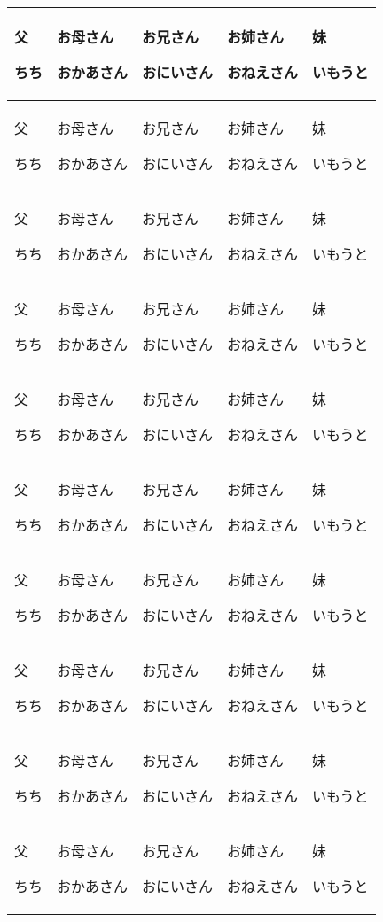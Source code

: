 \documentclass[10pt,a4j, landscape, dvipdfmx]{utarticle}
\def\cell(#1,#2){\hspace*{.1cm} #1 \newline \rule{0pt}{4ex} \hspace*{1cm} {\small #2}}
\begin{document}
\newcommand\T{\rule{0pt}{2.6ex}} 


\begin{tabular}{|p{3.5cm} | p{3.5cm} | p{3.5cm} |  p{3.5cm} |  p{3.5cm} |}
\hline 
 \cell(父,ちち) & \cell(お母さん,おかあさん) & \cell(お兄さん,おにいさん) & \cell(お姉さん,おねえさん) & \cell(妹,いもうと) \tabularnewline \hline
 \cell(父,ちち) & \cell(お母さん,おかあさん) & \cell(お兄さん,おにいさん) & \cell(お姉さん,おねえさん) & \cell(妹,いもうと) \tabularnewline \hline
 \cell(父,ちち) & \cell(お母さん,おかあさん) & \cell(お兄さん,おにいさん) & \cell(お姉さん,おねえさん) & \cell(妹,いもうと) \tabularnewline \hline
 \cell(父,ちち) & \cell(お母さん,おかあさん) & \cell(お兄さん,おにいさん) & \cell(お姉さん,おねえさん) & \cell(妹,いもうと) \tabularnewline \hline
 \cell(父,ちち) & \cell(お母さん,おかあさん) & \cell(お兄さん,おにいさん) & \cell(お姉さん,おねえさん) & \cell(妹,いもうと) \tabularnewline \hline
 \cell(父,ちち) & \cell(お母さん,おかあさん) & \cell(お兄さん,おにいさん) & \cell(お姉さん,おねえさん) & \cell(妹,いもうと) \tabularnewline \hline
 \cell(父,ちち) & \cell(お母さん,おかあさん) & \cell(お兄さん,おにいさん) & \cell(お姉さん,おねえさん) & \cell(妹,いもうと) \tabularnewline \hline
 \cell(父,ちち) & \cell(お母さん,おかあさん) & \cell(お兄さん,おにいさん) & \cell(お姉さん,おねえさん) & \cell(妹,いもうと) \tabularnewline \hline
 \cell(父,ちち) & \cell(お母さん,おかあさん) & \cell(お兄さん,おにいさん) & \cell(お姉さん,おねえさん) & \cell(妹,いもうと) \tabularnewline \hline
 \cell(父,ちち) & \cell(お母さん,おかあさん) & \cell(お兄さん,おにいさん) & \cell(お姉さん,おねえさん) & \cell(妹,いもうと) \tabularnewline \hline
\end{tabular} 
\end{document}
